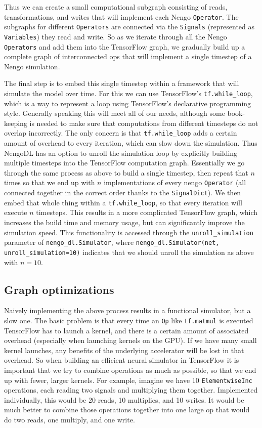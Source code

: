 \documentclass{article}
\begin{document}
Thus we can create a small computational subgraph consisting of reads, transformations, and writes that will implement each Nengo \texttt{Operator}.  The subgraphs for different \texttt{Operators} are connected via the \texttt{Signals} (represented as \texttt{Variables}) they read and write.  So as we iterate through all the Nengo \texttt{Operators} and add them into the TensorFlow graph, we gradually build up a complete graph of interconnected ops that will implement a single timestep of a Nengo simulation.

The final step is to embed this single timestep within a framework that will simulate the model over time.  For this we can use TensorFlow's \texttt{tf.while\_loop}, which is a way to represent a loop using TensorFlow's declarative programming style.  Generally speaking this will meet all of our needs, although some book-keeping is needed to make sure that computations from different timesteps do not overlap incorrectly.  The only concern is that \texttt{tf.while\_loop} adds a certain amount of overhead to every iteration, which can slow down the simulation.  Thus NengoDL has an option to unroll the simulation loop by explicitly building multiple timesteps into the TensorFlow computation graph.  Essentially we go through the same process as above to build a single timestep, then repeat that $n$ times so that we end up with $n$ implementations of every nengo \texttt{Operator} (all connected together in the correct order thanks to the \texttt{SignalDict}).  We then embed that whole thing within a \texttt{tf.while\_loop}, so that every iteration will execute $n$ timesteps.  This results in a more complicated TensorFlow graph, which increases the build time and memory usage, but can significantly improve the simulation speed.  This functionality is accessed through the \texttt{unroll\_simulation} parameter of \texttt{nengo\_dl.Simulator}, where \texttt{nengo\_dl.Simulator(net, unroll\_simulation=10)} indicates that we should unroll the simulation as above with $n=10$.

\subsection{Graph optimizations}

Naively implementing the above process results in a functional simulator, but a slow one.  The basic problem is that every time an \texttt{Op} like \texttt{tf.matmul} is executed TensorFlow has to launch a kernel, and there is a certain amount of associated overhead (especially when launching kernels on the GPU).  If we have many small kernel launches, any benefits of the underlying accelerator will be lost in that overhead.  So when building an efficient neural simulator in TensorFlow it is important that we try to combine operations as much as possible, so that we end up with fewer, larger kernels.  For example, imagine we have 10 \texttt{ElementwiseInc} operations, each reading two signals and multiplying them together.  Implemented individually, this would be 20 reads, 10 multiplies, and 10 writes.  It would be much better to combine those operations together into one large op that would do two reads, one multiply, and one write.
\end{document}
